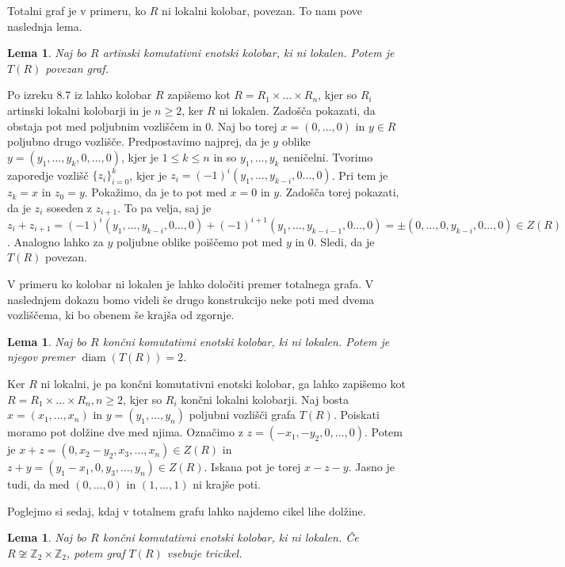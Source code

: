 \documentclass[a4paper, 12pt]{amsart}
\theoremstyle{definition} %
\theoremstyle{plain} %
\newtheorem{lema}[definicija]{Lema}
\newcommand{\Z}{\mathbb Z}
\DeclareMathOperator{\diam}{diam}
\begin{document}
Totalni graf je v primeru, ko $R$ ni lokalni kolobar, povezan. To nam pove naslednja lema.
\begin{lema}
Naj bo $R$ artinski komutativni enotski kolobar, ki ni lokalen. Potem je $T(R)$ povezan graf.
\end{lema}

\proof
Po izreku 8.7 iz \cite{Atiyah} lahko kolobar $R$ zapišemo kot $R=R_1 \times \dots \times R_n$, kjer so $R_i$ artinski lokalni kolobarji in je $n\ge 2$, ker $R$ ni lokalen. Zadošča pokazati, da obstaja pot med poljubnim vozliščem in 0. Naj bo torej $x=(0,\dots,0)$ in $y\in R$ poljubno drugo vozlišče. Predpostavimo najprej, da je $y$ oblike $y=(y_1,\dots,y_k,0,\dots,0)$, kjer je $1\le k \le n$ in so $y_1,\dots,y_k$ neničelni. Tvorimo zaporedje vozlišč $\{z_i\}_{i=0}^k$, kjer je $z_i = (-1)^i (y_1,\dots, y_{k-i},0\dots,0)$. Pri tem je $z_k = x $ in $z_0 = y$. Pokažimo, da je to pot med $x=0 $ in $y$. Zadošča torej pokazati, da je $z_i $ soseden z $z_{i+1}$. To pa velja, saj je $z_i + z_{i+1} =  (-1)^i (y_1,\dots, y_{k-i},0\dots,0) +  (-1)^{i+1} (y_1,\dots, y_{k-i-1},0\dots,0) = \pm  (0,\dots,0, y_{k-i},0\dots,0)\in Z(R)$. Analogno lahko za $y$ poljubne oblike poiščemo pot med $y$ in $0$. Sledi, da je $T(R)$ povezan.

\endproof

V primeru ko kolobar ni lokalen je lahko določiti premer totalnega grafa. V naslednjem dokazu bomo videli še drugo konstrukcijo neke poti med dvema vozliščema, ki bo obenem še krajša od zgornje.

\begin{lema}
Naj bo $R$ končni komutativni enotski kolobar, ki ni lokalen. Potem je njegov premer $\diam(T(R)) = 2$. 
\end{lema}

\proof
Ker $R$ ni lokalni, je pa končni komutativni enotski kolobar, ga lahko zapišemo kot $R= R_1 \times \dots \times R_n, n\ge 2$, kjer so $R_i$ končni lokalni kolobarji. Naj bosta $x=(x_1,\dots, x_n)$ in $y=(y_1,\dots,y_n)$ poljubni vozlišči grafa $T(R)$. Poiskati moramo pot dolžine dve med njima. Označimo z $z=(-x_1,-y_2,0,\dots,0)$. Potem je $x+z = (0,x_2 - y_2,x_3,\dots,x_n)\in Z(R)$ in $z+y = (y_1 - x_1,0,y_3,\dots,y_n)\in Z(R)$. Iskana pot je torej $x-z-y$.  Jasno je tudi, da med $(0,\dots,0)$ in $(1,\dots,1)$ ni krajše poti.
\endproof

Poglejmo si sedaj, kdaj v totalnem grafu lahko najdemo cikel lihe dolžine.

\begin{lema}
Naj bo $R$ končni komutativni enotski kolobar, ki ni lokalen. Če $R\not\cong \Z_2 \times \Z_2$, potem graf $T(R)$ vsebuje tricikel.
\end{lema}
\end{document}
